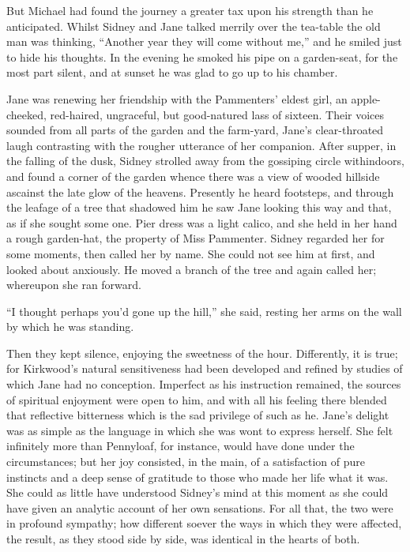 But Michael had found the journey a greater tax upon his strength than
he anticipated. Whilst Sidney and Jane talked merrily over the tea-table
the old man was thinking, {\protect\hypertarget{113}{}{}}``Another year
they will come without me,'' and he smiled just to hide his thoughts. In
the evening he smoked his pipe on a garden-seat, for the most part
silent, and at sunset he was glad to go up to his chamber.

Jane was renewing her friendship with the Pammenters' eldest girl, an
apple-cheeked, red-haired, ungraceful, but good-natured lass of sixteen.
Their voices sounded from all parts of the garden and the farm-yard,
Jane's clear-throated laugh contrasting with the rougher utterance of
her companion. After supper, in the falling of the dusk, Sidney strolled
away from the gossiping circle withindoors, and found a corner of the
garden whence there was a view of wooded hillside ascainst the late glow
of the heavens. Presently he heard footsteps, and through the leafage of
a tree that shadowed him he saw Jane looking this way and that, as if
she sought some one. Pier dress was a light calico, and she held in her
hand a rough garden-hat, the property of Miss Pammenter. Sidney regarded
her for some moments, then called her by name.
{\protect\hypertarget{114}{}{}}She could not see him at first, and
looked about anxiously. He moved a branch of the tree and again called
her; whereupon she ran forward.

``I thought perhaps you'd gone up the hill,'' she said, resting her arms
on the wall by which he was standing.

Then they kept silence, enjoying the sweetness of the hour. Differently,
it is true; for Kirkwood's natural sensitiveness had been developed and
refined by studies of which Jane had no conception. Imperfect as his
instruction remained, the sources of spiritual enjoyment were open to
him, and with all his feeling there blended that reflective bitterness
which is the sad privilege of such as he. Jane's delight was as simple
as the language in which she was wont to express herself. She felt
infinitely more than Pennyloaf, for instance, would have done under the
circumstances; but her joy consisted, in the main, of a satisfaction of
pure instincts and a deep sense of gratitude to those who made her life
what it was. She could as little have
{\protect\hypertarget{115}{}{}}understood Sidney's mind at this moment
as she could have given an analytic account of her own sensations. For
all that, the two were in profound sympathy; how different soever the
ways in which they were affected, the result, as they stood side by
side, was identical in the hearts of both.

